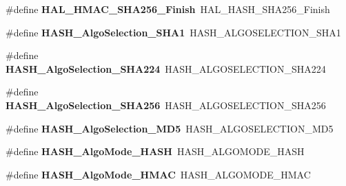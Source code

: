 \begin{DoxyCompactItemize}
\mbox{\label{group___h_a_l___h_a_s_h___aliased___functions_gaac86fd19acf8548fc6754c19e723d9f7}} 
\#define {\bfseries H\+A\+L\+\_\+\+H\+M\+A\+C\+\_\+\+S\+H\+A256\+\_\+\+Finish}~H\+A\+L\+\_\+\+H\+A\+S\+H\+\_\+\+S\+H\+A256\+\_\+\+Finish
\item 
\mbox{\label{group___h_a_l___h_a_s_h___aliased___functions_gaa866d6ac9e86d2290b012681836f22d0}} 
\#define {\bfseries H\+A\+S\+H\+\_\+\+Algo\+Selection\+\_\+\+S\+H\+A1}~H\+A\+S\+H\+\_\+\+A\+L\+G\+O\+S\+E\+L\+E\+C\+T\+I\+O\+N\+\_\+\+S\+H\+A1
\item 
\mbox{\label{group___h_a_l___h_a_s_h___aliased___functions_gaf8b9faddbf24e087ec70742275a16e97}} 
\#define {\bfseries H\+A\+S\+H\+\_\+\+Algo\+Selection\+\_\+\+S\+H\+A224}~H\+A\+S\+H\+\_\+\+A\+L\+G\+O\+S\+E\+L\+E\+C\+T\+I\+O\+N\+\_\+\+S\+H\+A224
\item 
\mbox{\label{group___h_a_l___h_a_s_h___aliased___functions_ga4dd93835c16dcffba7e303a2412d58ad}} 
\#define {\bfseries H\+A\+S\+H\+\_\+\+Algo\+Selection\+\_\+\+S\+H\+A256}~H\+A\+S\+H\+\_\+\+A\+L\+G\+O\+S\+E\+L\+E\+C\+T\+I\+O\+N\+\_\+\+S\+H\+A256
\item 
\mbox{\label{group___h_a_l___h_a_s_h___aliased___functions_gac443db7ebfff6d660b9321c59ecf48ed}} 
\#define {\bfseries H\+A\+S\+H\+\_\+\+Algo\+Selection\+\_\+\+M\+D5}~H\+A\+S\+H\+\_\+\+A\+L\+G\+O\+S\+E\+L\+E\+C\+T\+I\+O\+N\+\_\+\+M\+D5
\item 
\mbox{\label{group___h_a_l___h_a_s_h___aliased___functions_ga4de18ef48bad8fe403226abe769bd921}} 
\#define {\bfseries H\+A\+S\+H\+\_\+\+Algo\+Mode\+\_\+\+H\+A\+SH}~H\+A\+S\+H\+\_\+\+A\+L\+G\+O\+M\+O\+D\+E\+\_\+\+H\+A\+SH
\item 
\mbox{\label{group___h_a_l___h_a_s_h___aliased___functions_ga70224c1ea0eef2f45363f92fc001a875}} 
\#define {\bfseries H\+A\+S\+H\+\_\+\+Algo\+Mode\+\_\+\+H\+M\+AC}~H\+A\+S\+H\+\_\+\+A\+L\+G\+O\+M\+O\+D\+E\+\_\+\+H\+M\+AC
\item 

\end{DoxyCompactItemize}
